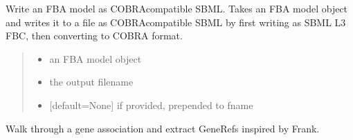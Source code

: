 \documentclass[letterpaper,12pt,english]{sphinxmanual}
\begin{document}

\begin{fulllineitems}
\label{\detokenize{api/io:cbmpy.CBXML.sbml_writeCOBRASBML}}
\pysigstartsignatures
\pysiglinewithargsret
{}
{\sphinxparamcomma {}\sphinxparamcomma {}}
{}
\pysigstopsignatures
\sphinxAtStartPar
Write an FBA model as COBRA\sphinxhyphen{}compatible SBML. Takes an FBA model object and writes it to a file as COBRA\sphinxhyphen{}compatible SBML by first writing as SBML L3 FBC, then converting to COBRA format.
\begin{quote}\begin{description}
\begin{itemize}
\item {} 
\sphinxAtStartPar
{} \textendash{} an FBA model object

\item {} 
\sphinxAtStartPar
{} \textendash{} the output filename

\item {} 
\sphinxAtStartPar
{} \textendash{} {[}default=None{]} if provided, prepended to fname

\end{itemize}

\sphinxAtStartPar
{}

\end{description}\end{quote}

\end{fulllineitems}


\begin{fulllineitems}
\label{\detokenize{api/io:cbmpy.CBXML.sbml_getGeneRefs}}
\pysigstartsignatures
\pysiglinewithargsret
{}
{\sphinxparamcomma {}}
{}
\pysigstopsignatures
\sphinxAtStartPar
Walk through a gene association and extract GeneRefs inspired by Frank.

\end{fulllineitems}
\end{document}
